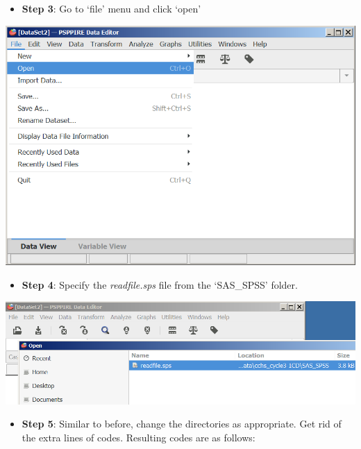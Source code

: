 \documentclass[
]{book}
\providecommand{\tightlist}{%
  \setlength{\itemsep}{0pt}\setlength{\parskip}{0pt}}
\begin{document}
\begin{itemize}
\tightlist
\item
  \textbf{Step 3}: Go to `file' menu and click `open'
\end{itemize}

\includegraphics[width=0.65\linewidth]{images/abacus32}

\begin{itemize}
\tightlist
\item
  \textbf{Step 4}: Specify the \emph{readfile.sps} file from the `SAS\_SPSS' folder.
\end{itemize}

\includegraphics[width=0.65\linewidth]{images/abacus33}

\begin{itemize}
\tightlist
\item
  \textbf{Step 5}: Similar to before, change the directories as appropriate. Get rid of the extra lines of codes. Resulting codes are as follows:
\end{itemize}
\end{document}
